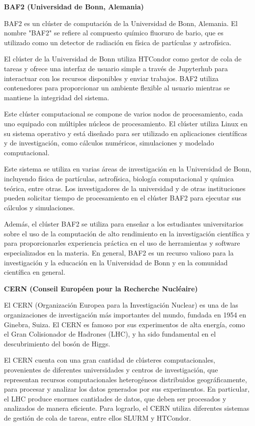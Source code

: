 \begin{spacing}{1.5}
  \textbf{BAF2 (Universidad de Bonn, Alemania)}

  BAF2 es un clúster de computación de la Universidad de Bonn, Alemania. El
  nombre "BAF2" se refiere al compuesto químico fluoruro de bario, que es
  utilizado como un detector de radiación en física de partículas y astrofísica.

  El clúster de la Universidad de Bonn utiliza HTCondor como gestor de cola de
  tareas y ofrece una interfaz de usuario simple a través de Jupyterhub para
  interactuar con los recursos disponibles y enviar trabajos. BAF2 utiliza
  contenedores para proporcionar un ambiente flexible al usuario mientras se
  mantiene la integridad del sistema.

  Este clúster computacional se compone de varios nodos de procesamiento, cada
  uno equipado con múltiples núcleos de procesamiento. El clúster utiliza Linux
  en su sistema operativo y está diseñado para ser utilizado en aplicaciones
  científicas y de investigación, como cálculos numéricos, simulaciones y
  modelado computacional.

  Este sistema se utiliza en varias áreas de investigación en la Universidad de
  Bonn, incluyendo física de partículas, astrofísica, biología computacional y
  química teórica, entre otras. Los investigadores de la universidad y de otras
  instituciones pueden solicitar tiempo de procesamiento en el clúster BAF2 para
  ejecutar sus cálculos y simulaciones.

  Además, el clúster BAF2 se utiliza para enseñar a los estudiantes
  universitarios sobre el uso de la computación de alto rendimiento en la
  investigación científica y para proporcionarles experiencia práctica en el uso
  de herramientas y software especializados en la materia. En general, BAF2 es un
  recurso valioso para la investigación y la educación en la Universidad de Bonn
  y en la comunidad científica en general.

  \textbf{CERN (Conseil Européen pour la Recherche Nucléaire)}

  El CERN (Organización Europea para la Investigación Nuclear) es una de las
  organizaciones de investigación más importantes del mundo, fundada en 1954 en
  Ginebra, Suiza. El CERN es famoso por sus experimentos de alta energía, como el
  Gran Colisionador de Hadrones (LHC), y ha sido fundamental en el descubrimiento
  del bosón de Higgs.

  El CERN cuenta con una gran cantidad de clústeres computacionales,
  provenientes de diferentes universidades y centros de investigación, que
  representan recursos computacionales heterogéneos distribuidos geográficamente,
  para procesar y analizar los datos generados por sus experimentos. En
  particular, el LHC produce enormes cantidades de datos, que deben ser
  procesados y analizados de manera eficiente. Para lograrlo, el CERN utiliza
  diferentes sistemas de gestión de cola de tareas, entre ellos SLURM y HTCondor.


\end{spacing}
